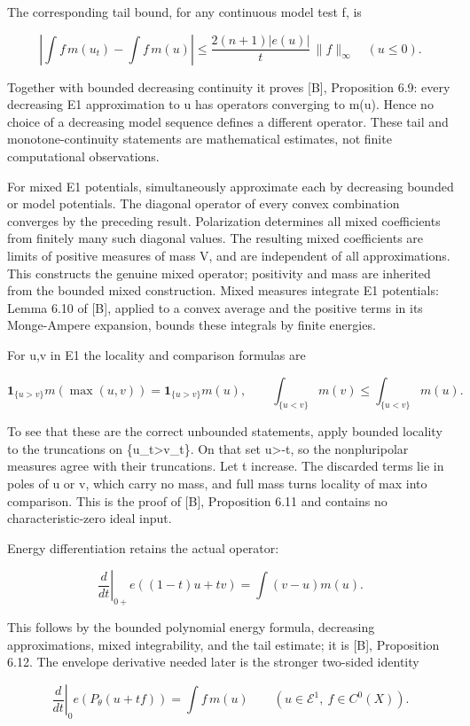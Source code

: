 \documentclass[11pt]{article}
\begin{document}
The corresponding tail bound, for any continuous model test f, is

\[
\left|\int f\,m(u_t)-\int f\,m(u)\right|
\leq \frac{2(n+1)|e(u)|}{t}\,\|f\|_\infty\quad(u\leq0).
\]

Together with bounded decreasing continuity it proves [B], Proposition 6.9: every decreasing E1 approximation to u has operators converging to m(u). Hence no choice of a decreasing model sequence defines a different operator. These tail and monotone-continuity statements are mathematical estimates, not finite computational observations.

For mixed E1 potentials, simultaneously approximate each by decreasing bounded or model potentials. The diagonal operator of every convex combination converges by the preceding result. Polarization determines all mixed coefficients from finitely many such diagonal values. The resulting mixed coefficients are limits of positive measures of mass V, and are independent of all approximations. This constructs the genuine mixed operator; positivity and mass are inherited from the bounded mixed construction. Mixed measures integrate E1 potentials: Lemma 6.10 of [B], applied to a convex average and the positive terms in its Monge-Ampere expansion, bounds these integrals by finite energies.

For u,v in E1 the locality and comparison formulas are

\[
\mathbf1_{\{u>v\}}m(\max(u,v))=\mathbf1_{\{u>v\}}m(u),\qquad
\int_{\{u<v\}}m(v)\leq\int_{\{u<v\}}m(u).
\]

To see that these are the correct unbounded statements, apply bounded locality to the truncations on \{u\_t\textgreater{}v\_t\}. On that set u\textgreater{}-t, so the nonpluripolar measures agree with their truncations. Let t increase. The discarded terms lie in poles of u or v, which carry no mass, and full mass turns locality of max into comparison. This is the proof of [B], Proposition 6.11 and contains no characteristic-zero ideal input.

Energy differentiation retains the actual operator:

\[
\left.\frac{d}{dt}\right|_{0+} e((1-t)u+tv)=\int(v-u)m(u).
\]

This follows by the bounded polynomial energy formula, decreasing approximations, mixed integrability, and the tail estimate; it is [B], Proposition 6.12. The envelope derivative needed later is the stronger two-sided identity

\[
\left.\frac{d}{dt}\right|_0 e(P_\theta(u+tf))=\int f\,m(u)
\qquad(u\in\mathcal E^1,\ f\in C^0(X)).
\]
\end{document}
